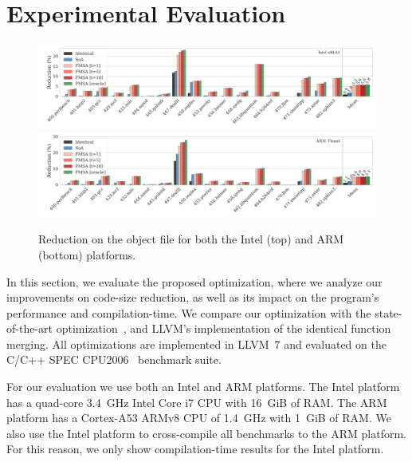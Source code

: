 \section{Experimental Evaluation}
\begin{figure}[t!]
  \centering
  \includegraphics[width=\linewidth]{figs/reduction-obj-intel-label.pdf} \\
  \vspace{-1.8ex}  
  \includegraphics[width=\linewidth]{figs/reduction-obj-arm-label.pdf}
  \vspace{-4ex}
  \caption{Reduction on the object file for both the Intel (top) and ARM (bottom) platforms.}
  \label{fig:reduction-obj}
\end{figure}

In this section, we evaluate the proposed optimization, where we analyze our
improvements on code-size reduction, as well as its impact on the program's
performance and compilation-time.
We compare our optimization with the state-of-the-art optimization~\cite{edler14},
and LLVM's implementation of the identical function merging.
All optimizations are implemented in LLVM~7 and evaluated on the C/C++ SPEC
CPU2006~\cite{spec} benchmark suite.

For our evaluation we use both an Intel and ARM platforms.
The Intel platform has a quad-core 3.4~GHz Intel Core i7 CPU with 16~GiB of RAM.
The ARM platform has a Cortex-A53 ARMv8 CPU of 1.4~GHz with 1~GiB of RAM.
We also use the Intel platform to cross-compile all benchmarks to the ARM
platform.
For this reason, we only show compilation-time results for the Intel platform.

